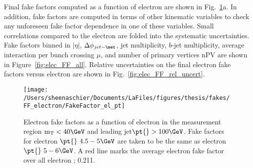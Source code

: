 Final fake factors computed as a function of electron \pt{} are shown in Fig.~\ref{fig:elec_FF_hist}a.  In addition, fake factors are computed in terms of other kinematic variables to check any unforeseen fake factor dependence in one of these variables.  Small correlations compared to the electron \pt are folded into the systematic uncertainties.  
Fake factors binned in $|\eta|$, $\Delta\phi_{jet-\met}$, jet multiplicity, $b$-jet multiplicity, average interaction per bunch crossing $\mu$, and number of primary vertices nPV are shown in Figure~\ref{fig:elec_FF_all}.  Relative uncertainties on the final electron fake factors versus electron \pt{} are shown in Fig.~\ref{fig:elec_FF_rel_uncert}.
\begin{figure}[tbp]
  \centering
  \texttt{[image: /Users/sheenaschier/Documents/LaFiles/figures/thesis/fakes/FF\_electron/FakeFactor\_el\_pt]}
  \caption{Electron fake factors as a function of electron \pt{} in the measurement region $\mathrm{m_T} < 40\GeV$ and leading jet$ \pt{}>100\GeV$.  Fake factors for electron $\pt{}~ 4.5-5\GeV$ are taken to be the same as electron $\pt{}~5-6\GeV$.  A red line marks the average electron fake factor over all electron \pt{}; 0.211. }
  \label{fig:elec_FF_hist}
\end{figure}

